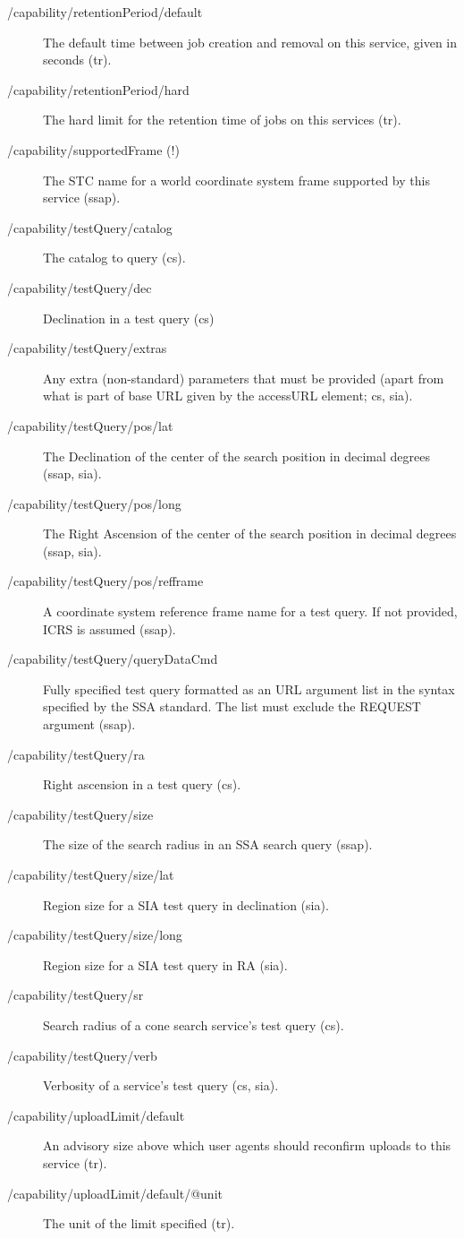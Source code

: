 \documentclass[11pt,a4paper]{ivoa}
\begin{document}
\begin{description}
\item[/capability/retentionPeriod/default]The default time between job creation and removal on this service, given in seconds (tr).
\item[/capability/retentionPeriod/hard]The hard limit for the retention time of jobs on this services (tr).
\item[/capability/supportedFrame (!)]The STC name for a world coordinate system frame supported by this service (ssap).
\item[/capability/testQuery/catalog]The catalog to query (cs).
\item[/capability/testQuery/dec]Declination in a test query (cs)
\item[/capability/testQuery/extras]Any extra (non-standard) parameters that must be provided (apart from what is part of base URL given by the accessURL element; cs, sia).
\item[/capability/testQuery/pos/lat]The Declination of the center of the search position in decimal degrees (ssap, sia).
\item[/capability/testQuery/pos/long]The Right Ascension of the center of the search position in decimal degrees (ssap, sia).
\item[/capability/testQuery/pos/refframe]A coordinate system reference frame name for a test query. If not provided, ICRS is assumed (ssap).
\item[/capability/testQuery/queryDataCmd]Fully specified test query formatted as an URL argument list in the syntax specified by the SSA standard. The list must exclude the REQUEST argument (ssap).
\item[/capability/testQuery/ra]Right ascension in a test query (cs).
\item[/capability/testQuery/size]The size of the search radius in an SSA search query (ssap).
\item[/capability/testQuery/size/lat]Region size for a SIA test query in declination (sia).
\item[/capability/testQuery/size/long]Region size for a SIA test query in RA (sia).
\item[/capability/testQuery/sr]Search radius of a cone search service's test query (cs).
\item[/capability/testQuery/verb]Verbosity of a service's test query (cs, sia).
\item[/capability/uploadLimit/default]An advisory size above which user agents should reconfirm uploads to this service (tr).
\item[/capability/uploadLimit/default/@unit]The unit of the limit specified (tr).

\end{description}
\end{document}
